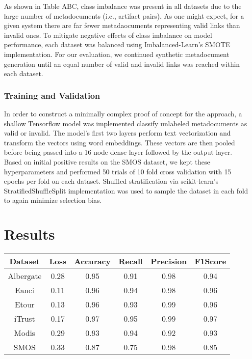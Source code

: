 \documentclass{article}
\begin{document}
    As shown in Table ABC, class imbalance was present in all datasets due to the large number of metadocuments (i.e., artifact pairs). As one might expect, for a given system there are far fewer metadaocuments representing valid links than invalid ones. To mitigate negative effects of class imbalance on model performance, each dataset was balanced using Imbalanced-Learn's\citep{JMLR:v18:16-365} SMOTE implementation. For our evaluation, we continued synthetic metadocument generation until an equal number of valid and invalid links was reached within each dataset.

\subsubsection{Training and Validation}
    In order to construct a minimally complex proof of concept for the approach, a shallow Tensorflow\citep{abadi2016tensorflow} model was implemented classify unlabeled metadocuments as valid or invalid. The model's first two layers perform text vectorization and transform the vectors using word embeddings. These vectors are then pooled before being passed into a 16 node dense layer followed by the output layer. Based on initial positive results on the SMOS dataset, we kept these hyperparameters and performed 50 trials of 10 fold cross validation with 15 epochs per fold on each dataset. Shuffled stratification via scikit-learn's\citep{sklearn_api} StratifiedShuffleSplit implementation was used to sample the dataset in each fold to again minimize selection bias. 

\section{Results}
\label{T:results}
    \begin{center}
        \begin{tabular}{ |c|c|c|c|c|c| } 
         \hline
         \textbf{Dataset} & \textbf{Loss} & \textbf{Accuracy} & \textbf{Recall} & \textbf{Precision} & \textbf{F1Score} \\ 
         \hline
         Albergate & 0.28 & 0.95 & 0.91 & 0.98 & 0.94 \\ 
         \hline
         Eanci & 0.11 & 0.96 & 0.94 & 0.98 & 0.96 \\ 
         \hline
         Etour & 0.13 & 0.96 & 0.93 & 0.99 & 0.96 \\ 
         \hline
         iTrust & 0.17 & 0.97 & 0.95 & 0.99 & 0.97 \\ 
         \hline
         Modis & 0.29 & 0.93 & 0.94 & 0.92 & 0.93 \\ 
         \hline
         SMOS & 0.33 & 0.87 & 0.75 & 0.98 & 0.85 \\ 
         \hline
        \end{tabular}
    \end{center}
    
\end{document}
